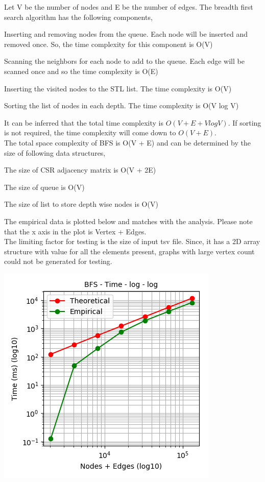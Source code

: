 \documentclass[11pt,a4paper,oneside]{article}
\begin{document}
    Let V be the number of nodes and E be the number of edges. The breadth first search algorithm has the following components,
    \begin{list}{*}{}
    	\item Inserting and removing nodes from the queue. Each node will be inserted and removed once. So, the time complexity for this component is O(V)
    	\item Scanning the neighbors for each node to add to the queue. Each edge will be scanned once and so the time complexity is O(E) 
    	\item Inserting the visited nodes to the STL list. The time complexity is O(V)
    	\item Sorting the list of nodes in each depth. The time complexity is O(V log V) 
    \end{list}
    It can be inferred that the total time complexity is $O(V + E + V log V)$. If sorting is not required, the time complexity will come down to $O(V+E)$. \\
    \newline
    The total space complexity of BFS is O(V + E) and can be determined by the size of following data structures,
    
    \begin{list}{*}{}
    	\item The size of CSR adjacency matrix is O(V + 2E)
    	\item The size of queue is O(V)
    	\item The size of list to store depth wise nodes is O(V)
    \end{list}

    The empirical data is plotted below and matches with the analysis. Please note that the x axis in the plot is Vertex + Edges. \\
        
    The limiting factor for testing is the size of input tsv file. Since, it has a 2D array structure with value for all the elements present, graphs with large vertex count could not be generated for testing. 

    \begin{center}
    	\includegraphics[scale=0.6]{7.png}		
    \end{center}
\end{document}
